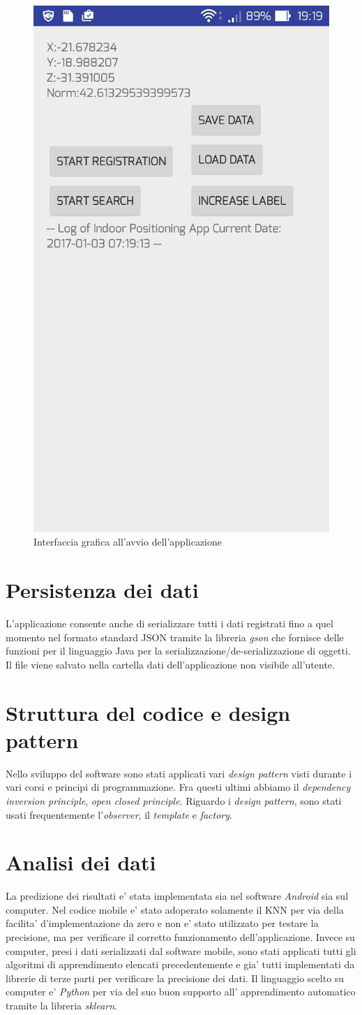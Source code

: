 \begin{figure}[H]
\centering
\includegraphics[width=0.3\linewidth]{img/app_screen}
\caption{Interfaccia grafica all'avvio dell'applicazione}
\label{fig:app_screen}
\end{figure}

\section{Persistenza dei dati}
L'applicazione consente anche di serializzare tutti i dati registrati fino a quel momento nel formato standard JSON tramite la libreria \textit{gson} che fornisce delle funzioni  per il linguaggio Java per la serializzazione/de-serializzazione di oggetti. Il file viene salvato nella cartella dati dell'applicazione non visibile all'utente.

\section{Struttura del codice e design pattern}
Nello sviluppo del software sono stati applicati vari \textit{design pattern} visti durante i vari corsi e principi di programmazione. Fra questi ultimi abbiamo il \textit{dependency inversion principle}, \textit{open closed principle}. Riguardo i \textit{design pattern}, sono stati usati frequentemente l'\textit{observer}, il \textit{template} e \textit{factory}.

\section{Analisi dei dati}
La predizione dei risultati e' stata implementata sia nel software \textit{Android} sia sul computer. Nel codice mobile e' stato adoperato solamente il KNN per via della facilita' d'implementazione da zero e non e' stato  utilizzato per testare la precisione, ma per verificare il corretto funzionamento dell'applicazione. Invece su computer, presi i dati serializzati dal software mobile, sono stati applicati tutti gli algoritmi di apprendimento elencati precedentemente e gia' tutti implementati da librerie di terze parti per verificare la precisione dei dati. Il linguaggio scelto su computer e' \textit{Python} per via del suo buon supporto all' apprendimento automatico tramite la libreria \textit{sklearn}.


